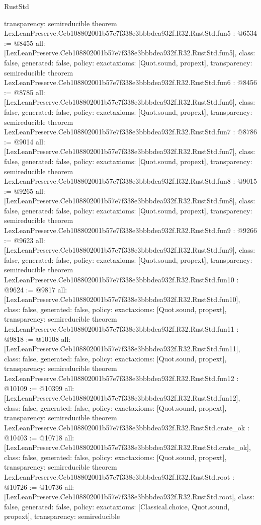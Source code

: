 \begin{lexlean}{RustStd}
\begin{coremodule}
{  transparency: semireducible
}
theorem LexLeanPreserve.Ceb108802001b57e7f338e3bbbdea932f.R32.RustStd.fun5 : @6534 := @8455 {
  all: [LexLeanPreserve.Ceb108802001b57e7f338e3bbbdea932f.R32.RustStd.fun5],
  class: false,
  generated: false,
  policy: exact{axioms: [Quot.sound, propext]},
  transparency: semireducible
}
theorem LexLeanPreserve.Ceb108802001b57e7f338e3bbbdea932f.R32.RustStd.fun6 : @8456 := @8785 {
  all: [LexLeanPreserve.Ceb108802001b57e7f338e3bbbdea932f.R32.RustStd.fun6],
  class: false,
  generated: false,
  policy: exact{axioms: [Quot.sound, propext]},
  transparency: semireducible
}
theorem LexLeanPreserve.Ceb108802001b57e7f338e3bbbdea932f.R32.RustStd.fun7 : @8786 := @9014 {
  all: [LexLeanPreserve.Ceb108802001b57e7f338e3bbbdea932f.R32.RustStd.fun7],
  class: false,
  generated: false,
  policy: exact{axioms: [Quot.sound, propext]},
  transparency: semireducible
}
theorem LexLeanPreserve.Ceb108802001b57e7f338e3bbbdea932f.R32.RustStd.fun8 : @9015 := @9265 {
  all: [LexLeanPreserve.Ceb108802001b57e7f338e3bbbdea932f.R32.RustStd.fun8],
  class: false,
  generated: false,
  policy: exact{axioms: [Quot.sound, propext]},
  transparency: semireducible
}
theorem LexLeanPreserve.Ceb108802001b57e7f338e3bbbdea932f.R32.RustStd.fun9 : @9266 := @9623 {
  all: [LexLeanPreserve.Ceb108802001b57e7f338e3bbbdea932f.R32.RustStd.fun9],
  class: false,
  generated: false,
  policy: exact{axioms: [Quot.sound, propext]},
  transparency: semireducible
}
theorem LexLeanPreserve.Ceb108802001b57e7f338e3bbbdea932f.R32.RustStd.fun10 : @9624 := @9817 {
  all: [LexLeanPreserve.Ceb108802001b57e7f338e3bbbdea932f.R32.RustStd.fun10],
  class: false,
  generated: false,
  policy: exact{axioms: [Quot.sound, propext]},
  transparency: semireducible
}
theorem LexLeanPreserve.Ceb108802001b57e7f338e3bbbdea932f.R32.RustStd.fun11 : @9818 := @10108 {
  all: [LexLeanPreserve.Ceb108802001b57e7f338e3bbbdea932f.R32.RustStd.fun11],
  class: false,
  generated: false,
  policy: exact{axioms: [Quot.sound, propext]},
  transparency: semireducible
}
theorem LexLeanPreserve.Ceb108802001b57e7f338e3bbbdea932f.R32.RustStd.fun12 : @10109 := @10399 {
  all: [LexLeanPreserve.Ceb108802001b57e7f338e3bbbdea932f.R32.RustStd.fun12],
  class: false,
  generated: false,
  policy: exact{axioms: [Quot.sound, propext]},
  transparency: semireducible
}
theorem LexLeanPreserve.Ceb108802001b57e7f338e3bbbdea932f.R32.RustStd.crate_ok : @10403 := @10718 {
  all: [LexLeanPreserve.Ceb108802001b57e7f338e3bbbdea932f.R32.RustStd.crate_ok],
  class: false,
  generated: false,
  policy: exact{axioms: [Quot.sound, propext]},
  transparency: semireducible
}
theorem LexLeanPreserve.Ceb108802001b57e7f338e3bbbdea932f.R32.RustStd.root : @10726 := @10736 {
  all: [LexLeanPreserve.Ceb108802001b57e7f338e3bbbdea932f.R32.RustStd.root],
  class: false,
  generated: false,
  policy: exact{axioms: [Classical.choice, Quot.sound, propext]},
  transparency: semireducible
}


\end{coremodule}
\end{lexlean}
